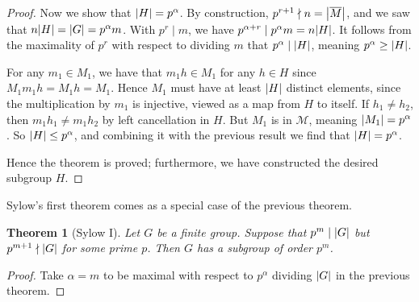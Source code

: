 \documentclass[11pt]{article}
\newtheorem*{theorem}{Theorem}
\begin{document}
\begin{proof}
    Now we show that $\abs{H} = p^\alpha$. By construction, $p^{r+1}\nmid n = \abs{\overline{M}}$, and we saw that $n\abs{H} = \abs{G} = p^\alpha m$. With $p^r\mid m$, we have $p^{\alpha + r}\mid p^\alpha m = n\abs{H}$. It follows from the maximality of $p^r$ with respect to dividing $m$ that $p^\alpha \mid \abs{H}$, meaning $p^\alpha\geq \abs{H}$.

    For any $m_1\in M_1$, we have that $m_1h\in M_1$ for any $h\in H$ since $M_1m_1h = M_1h = M_1$. Hence $M_1$ must have at least $\abs{H}$ distinct elements, since the multiplication by $m_1$ is injective, viewed as a map from $H$ to itself. If $h_1\neq h_2$, then $m_1h_1\neq m_1h_2$ by left cancellation in $H$. But $M_1$ is in $\mathcal{M}$, meaning $\abs{M_1} = p^\alpha$. So $\abs{H}\leq p^\alpha$, and combining it with the previous result we find that $\abs{H} = p^\alpha$.

    Hence the theorem is proved; furthermore, we have constructed the desired subgroup $H$.
\end{proof}

Sylow's first theorem comes as a special case of the previous theorem.

\begin{theorem}[Sylow I]
    Let $G$ be a finite group. Suppose that $p^m\mid \abs{G}$ but $p^{m+1}\nmid \abs{G}$ for some prime $p$. Then $G$ has a subgroup of order $p^m$.
\end{theorem}
\begin{proof}
    Take $\alpha = m$ to be maximal with respect to $p^\alpha$ dividing $\abs{G}$ in the previous theorem.
\end{proof}
\end{document}

